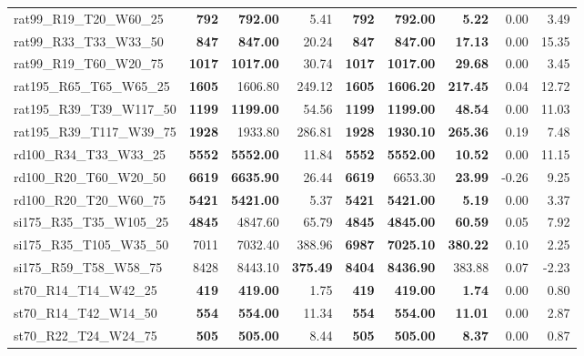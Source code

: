 \documentclass{singlecol-new}
\begin{document}
\begin{scriptsize}
\begin{longtable}{lrrrrrrrr}
		rat99\_R19\_T20\_W60\_25 & \textbf{792} & \textbf{792.00} & 5.41 & \textbf{792} & \textbf{792.00} & \textbf{5.22} & 0.00 & 3.49 \\
		rat99\_R33\_T33\_W33\_50 & \textbf{847} & \textbf{847.00} & 20.24 & \textbf{847} & \textbf{847.00} & \textbf{17.13} & 0.00 & 15.35 \\
		rat99\_R19\_T60\_W20\_75 & \textbf{1017} & \textbf{1017.00} & 30.74 & \textbf{1017} & \textbf{1017.00} & \textbf{29.68} & 0.00 & 3.45 \\
		rat195\_R65\_T65\_W65\_25 & \textbf{1605} & 1606.80 & 249.12 & \textbf{1605} & \textbf{1606.20} & \textbf{217.45} & 0.04 & 12.72 \\
		rat195\_R39\_T39\_W117\_50 & \textbf{1199} & \textbf{1199.00} & 54.56 & \textbf{1199} & \textbf{1199.00} & \textbf{48.54} & 0.00 & 11.03 \\
		rat195\_R39\_T117\_W39\_75 & \textbf{1928} & 1933.80 & 286.81 & \textbf{1928} & \textbf{1930.10} & \textbf{265.36} & 0.19 & 7.48 \\
		rd100\_R34\_T33\_W33\_25 & \textbf{5552} & \textbf{5552.00} & 11.84 & \textbf{5552} & \textbf{5552.00} & \textbf{10.52} & 0.00 & 11.15 \\
		rd100\_R20\_T60\_W20\_50 & \textbf{6619} & \textbf{6635.90} & 26.44 & \textbf{6619} & 6653.30 & \textbf{23.99} & -0.26 & 9.25 \\
		rd100\_R20\_T20\_W60\_75 & \textbf{5421} & \textbf{5421.00} & 5.37 & \textbf{5421} & \textbf{5421.00} & \textbf{5.19} & 0.00 & 3.37 \\
		si175\_R35\_T35\_W105\_25 & \textbf{4845} & 4847.60 & 65.79 & \textbf{4845} & \textbf{4845.00} & \textbf{60.59} & 0.05 & 7.92 \\
		si175\_R35\_T105\_W35\_50 & 7011 & 7032.40 & 388.96 & \textbf{6987} & \textbf{7025.10} & \textbf{380.22} & 0.10 & 2.25 \\
		si175\_R59\_T58\_W58\_75 & 8428 & 8443.10 & \textbf{375.49} & \textbf{8404} & \textbf{8436.90} & 383.88 & 0.07 & -2.23 \\
		st70\_R14\_T14\_W42\_25 & \textbf{419} & \textbf{419.00} & 1.75 & \textbf{419} & \textbf{419.00} & \textbf{1.74} & 0.00 & 0.80 \\
		st70\_R14\_T42\_W14\_50 & \textbf{554} & \textbf{554.00} & 11.34 & \textbf{554} & \textbf{554.00} & \textbf{11.01} & 0.00 & 2.87 \\
		st70\_R22\_T24\_W24\_75 & \textbf{505} & \textbf{505.00} & 8.44 & \textbf{505} & \textbf{505.00} & \textbf{8.37} & 0.00 & 0.87 \\

\end{longtable}
\end{scriptsize}
\end{document}

